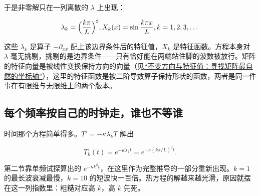 于是非零解只在一列离散的 \(\lambda\) 上出现：

\[
\lambda_k=\Bigl(\frac{k\pi}{L}\Bigr)^2,
\qquad
X_k(x)=\sin\frac{k\pi x}{L},
\qquad k=1,2,3,\dots
\]

这些 \(\lambda_k\) 是算子 \(-\partial_{xx}\) 配上该边界条件后的特征值，\(X_k\) 是特征函数。方程本身对 \(\lambda\) 毫无挑剔，挑剔的是边界条件——只有恰好能在两端站住脚的波数被放行。矩阵的特征向量是被线性变换保持方向的向量（见\hyperref[sec:03-Linear-Algebra/05-Eigenvalues-and-Eigenvectors/01]{``不变方向与特征值：寻找矩阵最自然的坐标轴''}），这里的特征函数是被二阶导数算子保持形状的函数，两者是同一件事在有限维与无限维上的两个版本。

\subsection{每个频率按自己的时钟走，谁也不等谁}

时间那个方程简单得多。\(T'=-\kappa\lambda_kT\) 解出

\[
T_k(t)=e^{-\kappa\lambda_kt}=e^{-\kappa(k\pi/L)^2t} .
\]

第二节靠单频试探算出的 \(e^{-\kappa k^2t}\)，在这里作为完整推导的一部分重新出现。\(k=1\) 的最长波衰减最慢，\(k=10\) 的短波快一百倍。热方程的解越来越光滑，原因就摆在这一列指数里：粗糙对应高 \(k\)，高 \(k\) 先死。

